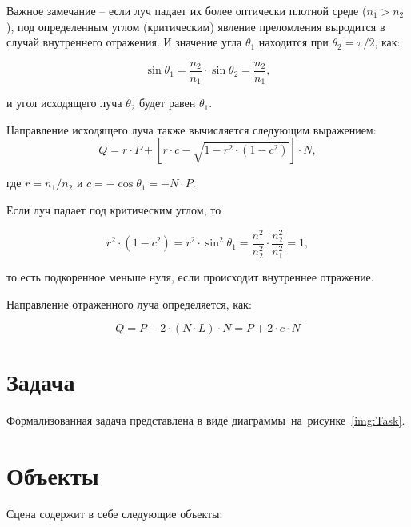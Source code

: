 Важное замечание -- если луч падает их более оптически плотной среде ($n_1 > n_2$), под определенным углом (критическим) явление преломления выродится в случай внутреннего отражения. И значение угла $\theta_1$ находится при $\theta_2 = \pi / 2$, как:

\begin{equation}
	\sin\theta_1 = \frac{n_2}{n_1} \cdot \sin\theta_2 = \frac{n_2}{n_1},
\end{equation}

и угол исходящего луча $\theta_2$ будет равен $\theta_1$.

Направление исходящего луча также вычисляется следующим выражением:
\begin{equation}
	 Q =r \cdot P + \left[r \cdot c- {\sqrt {1-r^{2} \cdot (1-c^{2})}}\right] \cdot N,
\end{equation}

где $r=n_{1}/n_{2}$ и $c = -\cos\theta_1 = -N \cdot P$.

Если луч падает под критическим углом, то

\begin{equation}
	r^2 \cdot (1 - c^2) = r^2 \cdot \sin^2 \theta_1 = \frac{n_1^2}{n_2^2} \cdot \frac{n_2^2}{n_1^2} = 1, 
\end{equation}

то есть подкоренное меньше нуля, если происходит внутреннее отражение.

Направление отраженного луча определяется, как:

\begin{equation}
	Q = P - 2 \cdot (N \cdot L) \cdot N = P + 2 \cdot c \cdot N
\end{equation}

\section{Задача}

Формализованная задача представлена в виде диаграммы~на~рисунке~\ref{img:Task}.\newline



\section{Объекты}

Сцена содержит в себе следующие объекты:

